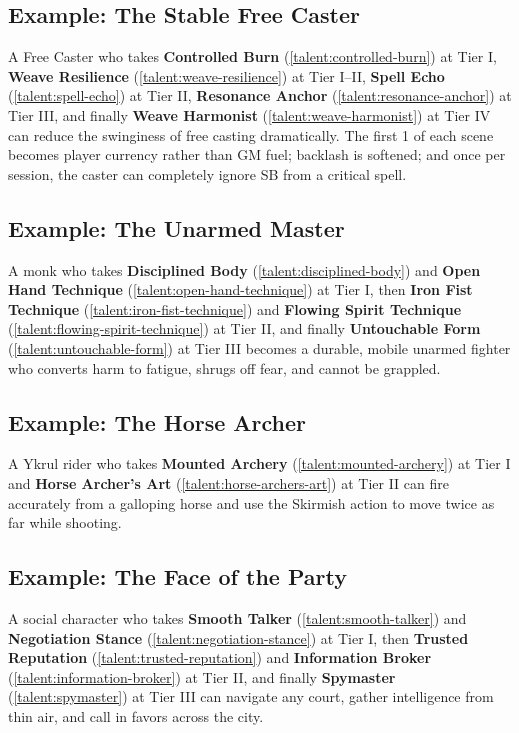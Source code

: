 \documentclass[12pt,a4paper]{book}
\begin{document}
\subsection*{Example: The Stable Free Caster}
\label{sec:stable-freecaster-example}
A Free Caster who takes \textbf{Controlled Burn} (\ref{talent:controlled-burn}) at Tier I, \textbf{Weave Resilience} (\ref{talent:weave-resilience}) at Tier I--II, \textbf{Spell Echo} (\ref{talent:spell-echo}) at Tier II, \textbf{Resonance Anchor} (\ref{talent:resonance-anchor}) at Tier III, and finally \textbf{Weave Harmonist} (\ref{talent:weave-harmonist}) at Tier IV can reduce the swinginess of free casting dramatically. The first 1 of each scene becomes player currency rather than GM fuel; backlash is softened; and once per session, the caster can completely ignore SB from a critical spell.

\subsection*{Example: The Unarmed Master}
\label{sec:unarmed-master-example}
A monk who takes \textbf{Disciplined Body} (\ref{talent:disciplined-body}) and \textbf{Open Hand Technique} (\ref{talent:open-hand-technique}) at Tier I, then \textbf{Iron Fist Technique} (\ref{talent:iron-fist-technique}) and \textbf{Flowing Spirit Technique} (\ref{talent:flowing-spirit-technique}) at Tier II, and finally \textbf{Untouchable Form} (\ref{talent:untouchable-form}) at Tier III becomes a durable, mobile unarmed fighter who converts harm to fatigue, shrugs off fear, and cannot be grappled.

\subsection*{Example: The Horse Archer}
\label{sec:horse-archer-example}
A Ykrul rider who takes \textbf{Mounted Archery} (\ref{talent:mounted-archery}) at Tier I and \textbf{Horse Archer's Art} (\ref{talent:horse-archers-art}) at Tier II can fire accurately from a galloping horse and use the Skirmish action to move twice as far while shooting.

\subsection*{Example: The Face of the Party}
\label{sec:face-example}
A social character who takes \textbf{Smooth Talker} (\ref{talent:smooth-talker}) and \textbf{Negotiation Stance} (\ref{talent:negotiation-stance}) at Tier I, then \textbf{Trusted Reputation} (\ref{talent:trusted-reputation}) and \textbf{Information Broker} (\ref{talent:information-broker}) at Tier II, and finally \textbf{Spymaster} (\ref{talent:spymaster}) at Tier III can navigate any court, gather intelligence from thin air, and call in favors across the city.
\end{document}
